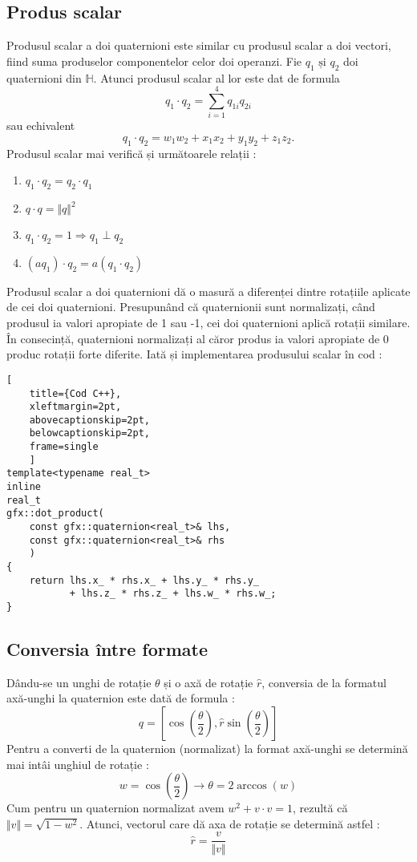 \subsection{Produs scalar}
\label{ch1:quaternions:scalar_product}
Produsul scalar a doi quaternioni este similar cu produsul scalar a doi vectori,
fiind suma produselor componentelor celor doi operanzi. Fie $q_{1} \text{ și }
q_{2}$ doi quaternioni din $\mathbb{H}$. Atunci produsul scalar al lor este dat de
formula
\begin{equation}
q_{1} \cdot q_{2} = \sum_{i = 1}^{4} q_{1i}q_{2i} 
\end{equation} sau echivalent
\begin{equation}
q_{1} \cdot q_{2} = w_{1}w_{2} + x_{1}x_{2} + y_{1}y_{2} + z_{1}z_{2}.
\end{equation}
Produsul scalar mai verifică și următoarele relații :
\begin{enumerate}
\item $q_1 \cdot q_2 = q_2 \cdot q_1$
\item $q \cdot q = \Vert q \Vert ^ 2$
\item $q_1 \cdot q_2 = 1 \Rightarrow q_1 \perp q_2$
\item $(\mathit{a}q_1) \cdot q_2 = \mathit{a}(q_1 \cdot q_2)$
\end{enumerate}
Produsul scalar a doi quaternioni dă o masură a diferenței dintre rotațiile
aplicate de cei doi quaternioni. Presupunând că quaternionii sunt normalizați,
când produsul ia valori apropiate de 1 sau -1, cei doi quaternioni aplică 
rotații similare. În consecință, quaternioni normalizați al căror produs ia
valori apropiate de 0 produc rotații  forte diferite. Iată și implementarea
produsului scalar în cod :

\begin{lstlisting}[
    title={Cod C++}, 
    xleftmargin=2pt,
    abovecaptionskip=2pt,
    belowcaptionskip=2pt,
    frame=single
    ]
template<typename real_t>
inline
real_t
gfx::dot_product(
    const gfx::quaternion<real_t>& lhs, 
    const gfx::quaternion<real_t>& rhs
    )
{
    return lhs.x_ * rhs.x_ + lhs.y_ * rhs.y_ 
           + lhs.z_ * rhs.z_ + lhs.w_ * rhs.w_;
}
\end{lstlisting}

\subsection{Conversia între formate}
Dându-se un unghi de rotație $\theta$ și o axă de rotație $\hat{r}$, conversia de 
la formatul axă-unghi la quaternion este dată de formula :
\begin{equation}
q = \left\lbrack \cos\left(\frac{\theta}{2}\right), 
    \hat{r}\sin\left(\frac{\theta}{2}\right) \right\rbrack 
\end{equation}
Pentru a converti de la quaternion (normalizat) la format axă-unghi se 
determină mai intâi unghiul de rotație :
\[
w = \cos\left(\frac{\theta}{2}\right) \rightarrow \theta = 2\arccos\left(w\right)
\]
Cum pentru un quaternion normalizat avem $w^2 + v \cdot v = 1$, rezultă că
$\Vert v \Vert = \sqrt{1 - w^2}$. Atunci, vectorul care dă axa de rotație se 
determină astfel :
\[
\hat{r} = \frac{v}{\Vert v \Vert}
\]

